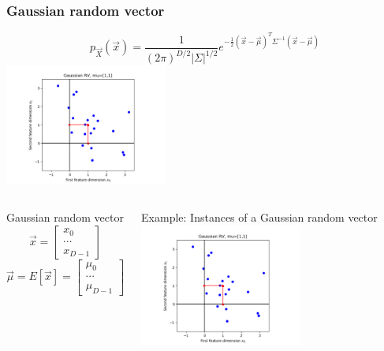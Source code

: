 \documentclass{beamer}
\begin{document}
\begin{frame}
  \frametitle{Gaussian random vector}
  \[
  p_{\vec{X}}(\vec{x})=\frac{1}{(2\pi)^{D/2}|\Sigma|^{1/2}}e^{-\frac{1}{2}
    (\vec{x}-\vec\mu)^T\Sigma^{-1}(\vec{x}-\vec\mu)}
  \]
  \includegraphics[width=2.1in]{gaussian_vectors.png}
\end{frame}

\begin{frame}
  \begin{columns}
    \column{2.125in}
    \begin{block}{Gaussian random vector}
      \[
      \vec{x}=\left[\begin{array}{c}x_0\\\cdots\\x_{D-1}\end{array}\right]
      \]
      \[
      \vec\mu=E[\vec{x}]=\left[\begin{array}{c}\mu_0\\\cdots\\\mu_{D-1}\end{array}\right]
      \]
    \end{block}
    \column{2.125in}
    \begin{block}{Example: Instances of a Gaussian random vector}
      \includegraphics[width=2.1in]{gaussian_vectors.png}
    \end{block}
  \end{columns}
\end{frame}
\end{document}

